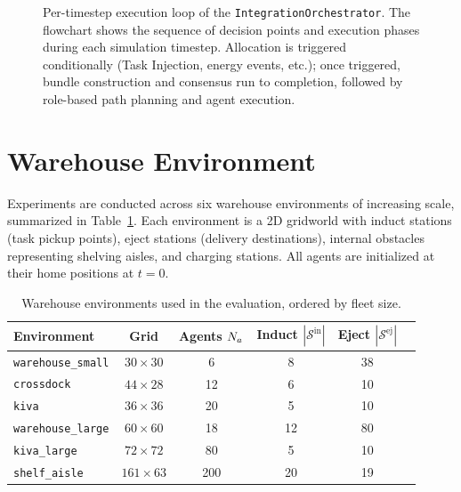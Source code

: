 \begin{figure}[htbp]
  \centering
  \resizebox{0.90\textwidth}{!}{%
  }
  \caption{Per-timestep execution loop of the \texttt{IntegrationOrchestrator}.
           The flowchart shows the sequence of decision points and execution
           phases during each simulation timestep. Allocation is triggered
           conditionally (Task Injection, energy events, etc.); once triggered,
           bundle construction and consensus run to completion, followed by
           role-based path planning and agent execution.}
  \label{fig:system_flowchart}
\end{figure}


\section{Warehouse Environment}
\label{sec:method_environment}

Experiments are conducted across six warehouse environments of increasing scale,
summarized in Table~\ref{tab:environments}.
Each environment is a 2D gridworld with induct stations (task pickup points),
eject stations (delivery destinations), internal obstacles representing shelving
aisles, and charging stations.
All agents are initialized at their home positions at $t = 0$.

\begin{table}[htbp]
  \centering
  \caption{Warehouse environments used in the evaluation, ordered by fleet size.}
  \label{tab:environments}
  \small
  \begin{tabular}{lccccc}
    \toprule
    \textbf{Environment} & \textbf{Grid} & \textbf{Agents} $N_a$ &
    \textbf{Induct} $|\mathcal{S}^{\text{in}}|$ &
    \textbf{Eject} $|\mathcal{S}^{\text{ej}}|$ \\
    \midrule
    \texttt{warehouse\_small}  & $30\times30$   & 6   & 8  & 38 \\
    \texttt{crossdock}         & $44\times28$   & 12  & 6  & 10 \\
    \texttt{kiva}              & $36\times36$   & 20  & 5  & 10 \\
    \texttt{warehouse\_large}  & $60\times60$   & 18  & 12 & 80 \\
    \texttt{kiva\_large}       & $72\times72$   & 80  & 5  & 10 \\
    \texttt{shelf\_aisle}      & $161\times63$  & 200 & 20 & 19 \\
    \bottomrule
  \end{tabular}
\end{table}


